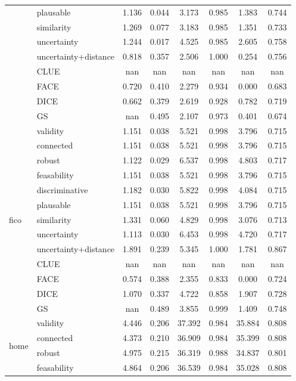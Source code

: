 \begin{table}[ht]
\begin{tabular}{l l c c c c c c}
 & plausable & 1.136 & 0.044 & 3.173 & 0.985 & 1.383 & 0.744 \\ 
 & similarity & 1.269 & 0.077 & 3.183 & 0.985 & 1.351 & 0.733 \\ 
 & uncertainty & 1.244 & 0.017 & 4.525 & 0.985 & 2.605 & 0.758 \\ 
 & uncertainty+distance & 0.818 & 0.357 & 2.506 & 1.000 & 0.254 & 0.756 \\ 
 & CLUE & nan & nan & nan & nan & nan & nan \\ 
 & FACE & 0.720 & 0.410 & 2.279 & 0.934 & 0.000 & 0.683 \\ 
 & DICE & 0.662 & 0.379 & 2.619 & 0.928 & 0.782 & 0.719 \\ 
 & GS & nan & 0.495 & 2.107 & 0.973 & 0.401 & 0.674 \\ 
\hline
\multirow{13}{*}{fico} & validity & 1.151 & 0.038 & 5.521 & 0.998 & 3.796 & 0.715 \\ 
 & connected & 1.151 & 0.038 & 5.521 & 0.998 & 3.796 & 0.715 \\ 
 & robust & 1.122 & 0.029 & 6.537 & 0.998 & 4.803 & 0.717 \\ 
 & feasability & 1.151 & 0.038 & 5.521 & 0.998 & 3.796 & 0.715 \\ 
 & discriminative & 1.182 & 0.030 & 5.822 & 0.998 & 4.084 & 0.715 \\ 
 & plausable & 1.151 & 0.038 & 5.521 & 0.998 & 3.796 & 0.715 \\ 
 & similarity & 1.331 & 0.060 & 4.829 & 0.998 & 3.076 & 0.713 \\ 
 & uncertainty & 1.113 & 0.030 & 6.453 & 0.998 & 4.720 & 0.717 \\ 
 & uncertainty+distance & 1.891 & 0.239 & 5.345 & 1.000 & 1.781 & 0.867 \\ 
 & CLUE & nan & nan & nan & nan & nan & nan \\ 
 & FACE & 0.574 & 0.388 & 2.355 & 0.833 & 0.000 & 0.724 \\ 
 & DICE & 1.070 & 0.337 & 4.722 & 0.858 & 1.907 & 0.728 \\ 
 & GS & nan & 0.489 & 3.855 & 0.999 & 1.409 & 0.748 \\ 
\hline
\multirow{13}{*}{home} & validity & 4.446 & 0.206 & 37.392 & 0.984 & 35.884 & 0.808 \\ 
 & connected & 4.373 & 0.210 & 36.909 & 0.984 & 35.399 & 0.808 \\ 
 & robust & 4.975 & 0.215 & 36.319 & 0.988 & 34.837 & 0.801 \\ 
 & feasability & 4.864 & 0.206 & 36.539 & 0.984 & 35.028 & 0.808 \\ 

\end{tabular}
\end{table}
